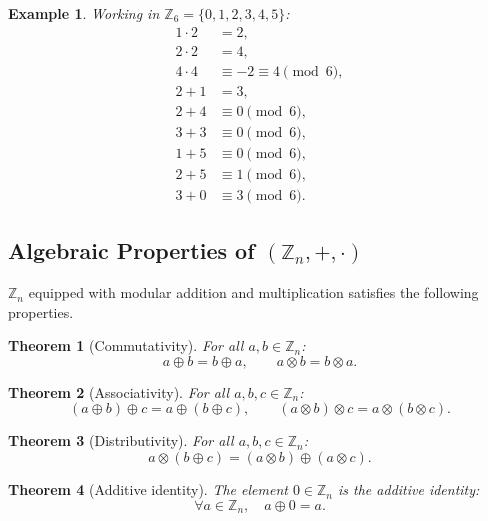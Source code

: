 \documentclass[11pt]{article}
\theoremstyle{defstyle}
\theoremstyle{thmstyle}
\newtheorem{theorem}{Theorem}[section]
\theoremstyle{notstyle}
\newtheorem*{example}{Example}
\theoremstyle{cautionstyle}
\begin{document}
\begin{example}
Working in $\mathbb{Z}_6 = \{0,1,2,3,4,5\}$:
\begin{align*}
  1 \cdot 2 &= 2, \\
  2 \cdot 2 &= 4, \\
  4 \cdot 4 &\equiv -2 \equiv 4 \pmod{6}, \\
  2 + 1 &= 3, \\
  2 + 4 &\equiv 0 \pmod{6}, \\
  3 + 3 &\equiv 0 \pmod{6}, \\
  1 + 5 &\equiv 0 \pmod{6}, \\
  2 + 5 &\equiv 1 \pmod{6}, \\
  3 + 0 &\equiv 3 \pmod{6}.
\end{align*}
\end{example}

\subsection{Algebraic Properties of \texorpdfstring{$(\mathbb{Z}_n, +, \cdot)$}{(Zn, +, .)}}

$\mathbb{Z}_n$ equipped with modular addition and multiplication satisfies the following properties.

\begin{thmbox}
\begin{theorem}[Commutativity]
For all $a, b \in \mathbb{Z}_n$:
\[
  a \oplus b = b \oplus a, \qquad a \otimes b = b \otimes a.
\]
\end{theorem}
\end{thmbox}

\begin{thmbox}
\begin{theorem}[Associativity]
For all $a, b, c \in \mathbb{Z}_n$:
\[
  (a \oplus b) \oplus c = a \oplus (b \oplus c), \qquad
  (a \otimes b) \otimes c = a \otimes (b \otimes c).
\]
\end{theorem}
\end{thmbox}

\begin{thmbox}
\begin{theorem}[Distributivity]
For all $a, b, c \in \mathbb{Z}_n$:
\[
  a \otimes (b \oplus c) = (a \otimes b) \oplus (a \otimes c).
\]
\end{theorem}
\end{thmbox}

\begin{thmbox}
\begin{theorem}[Additive identity]
The element $0 \in \mathbb{Z}_n$ is the additive identity:
\[
  \forall a \in \mathbb{Z}_n, \quad a \oplus 0 = a.
\]
\end{theorem}
\end{thmbox}
\end{document}
